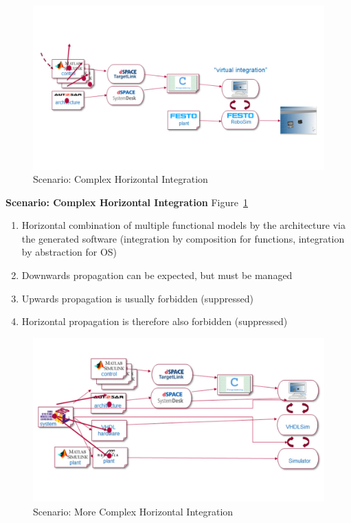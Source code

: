 {\begin{figure}[!htb]
\centering
\includegraphics[scale=0.33]{figures/mm-hpi15.pdf}
\caption{Scenario: Complex Horizontal Integration}
\label{fig:MMFig13}
\end{figure}
\newpage
{\bf Scenario: Complex Horizontal Integration} Figure~\ref{fig:MMFig13}

\begin{enumerate}
    \item Horizontal combination of multiple functional models by the architecture via the generated software (integration by composition for functions, integration by abstraction for OS)
\item Downwards propagation can be expected, but must be managed
\item Upwards propagation is usually forbidden (suppressed)
\item Horizontal propagation is therefore also forbidden (suppressed)
    
\end{enumerate}


\begin{figure}[!htb]
\centering
\includegraphics[scale=0.33]{figures/mm-hpi16.pdf}
\caption{Scenario: More Complex Horizontal Integration}
\label{fig:MMFig14}
\end{figure}

}
